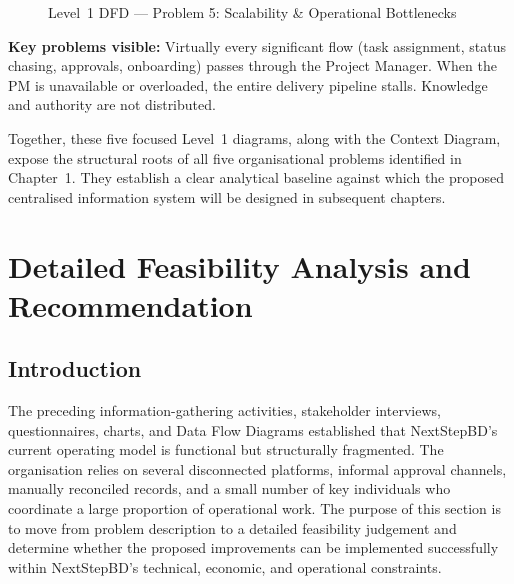 \documentclass[12pt,a4paper]{report}
\begin{document}
\begin{figure}[H]
{
}
\caption{Level~1 DFD — Problem 5: Scalability \& Operational Bottlenecks}
\label{fig:dfd_prob5}
\end{figure}

\begin{problemBox}
\textbf{Key problems visible:} Virtually every significant flow (task assignment, status chasing, approvals, onboarding) passes through the Project Manager. When the PM is unavailable or overloaded, the entire delivery pipeline stalls. Knowledge and authority are not distributed.
\end{problemBox}

\noindent Together, these five focused Level~1 diagrams, along with the Context Diagram, expose the structural roots of all five organisational problems identified in Chapter~1. They establish a clear analytical baseline against which the proposed centralised information system will be designed in subsequent chapters.



\section{Detailed Feasibility Analysis and Recommendation}
\label{sec:detailed-feasibility-and-recommendation}

\subsection{Introduction}

The preceding information-gathering activities, stakeholder interviews, questionnaires,
charts, and Data Flow Diagrams established that NextStepBD's current operating model is
functional but structurally fragmented. The organisation relies on several disconnected
platforms, informal approval channels, manually reconciled records, and a small number of
key individuals who coordinate a large proportion of operational work. The purpose of this
section is to move from problem description to a detailed feasibility judgement and determine
whether the proposed improvements can be implemented successfully within NextStepBD's
technical, economic, and operational constraints.
\end{document}
